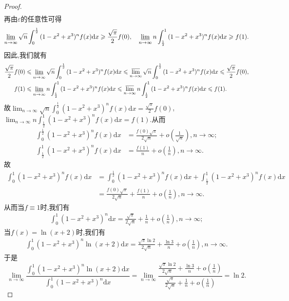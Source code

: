 \documentclass[../../main.tex]{subfiles}%
\begin{document}
\begin{proof}
\begin{align*}
\end{align*}
再由\(\varepsilon\)的任意性可得
\begin{align*}
\varliminf_{n\rightarrow\infty}\sqrt{n}\int_0^{\frac{1}{2}}{(1 - x^2 + x^3)^nf(x)\mathrm{d}x}\geqslant \frac{\sqrt{\pi}}{2}f(0),\quad \varliminf_{n\rightarrow\infty}n\int_{\frac{1}{2}}^1{(1 - x^2 + x^3)^nf(x)\mathrm{d}x}\geqslant f(1).
\end{align*}
因此,我们就有
\begin{align*}
\frac{\sqrt{\pi}}{2}f(0)&\leqslant \varliminf_{n\rightarrow\infty}\sqrt{n}\int_0^{\frac{1}{2}}{(1 - x^2 + x^3)^nf(x)\mathrm{d}x}\leqslant \varlimsup_{n\rightarrow\infty}\sqrt{n}\int_0^{\frac{1}{2}}{(1 - x^2 + x^3)^nf(x)\mathrm{d}x}\leqslant \frac{\sqrt{\pi}}{2}f(0),\\
f(1)&\leqslant \varliminf_{n\rightarrow\infty}n\int_{\frac{1}{2}}^1{(1 - x^2 + x^3)^nf(x)\mathrm{d}x}\leqslant \varlimsup_{n\rightarrow\infty}n\int_{\frac{1}{2}}^1{(1 - x^2 + x^3)^nf(x)\mathrm{d}x}\leqslant f(1).
\end{align*}
故\(\lim_{n\rightarrow\infty}\sqrt{n}\int_0^{\frac{1}{2}}{(1 - x^2 + x^3)^nf(x)\mathrm{d}x}=\frac{\sqrt{\pi}}{2}f(0)\),\(\lim_{n\rightarrow\infty}n\int_{\frac{1}{2}}^1{(1 - x^2 + x^3)^nf(x)\mathrm{d}x}=f(1)\).从而
\begin{align*}
\int_0^{\frac{1}{2}}{(1 - x^2 + x^3)^nf(x)\mathrm{d}x}&=\frac{f(0)\sqrt{\pi}}{2\sqrt{n}}+o\left(\frac{1}{\sqrt{n}}\right),  n\rightarrow\infty;\\
\int_{\frac{1}{2}}^1{(1 - x^2 + x^3)^nf(x)\mathrm{d}x}&=\frac{f(1)}{n}+o\left(\frac{1}{n}\right),  n\rightarrow\infty.
\end{align*}
故
\begin{align*}
\int_0^1{(1 - x^2 + x^3)^nf(x)\mathrm{d}x}&=\int_0^{\frac{1}{2}}{(1 - x^2 + x^3)^nf(x)\mathrm{d}x}+\int_{\frac{1}{2}}^1{(1 - x^2 + x^3)^nf(x)\mathrm{d}x}
\\
&=\frac{f(0)\sqrt{\pi}}{2\sqrt{n}}+\frac{f(1)}{n}+o\left(\frac{1}{n}\right),  n\rightarrow\infty.
\end{align*}
从而当\(f\equiv 1\)时,我们有
\begin{align*}
\int_0^1{(1 - x^2 + x^3)^n\mathrm{d}x}=\frac{\sqrt{\pi}}{2\sqrt{n}}+\frac{1}{n}+o\left(\frac{1}{n}\right),  n\rightarrow\infty;
\end{align*}
当\(f(x) = \ln(x + 2)\)时,我们有
\begin{align*}\int_0^1{(1 - x^2 + x^3)^n\ln(x + 2)\mathrm{d}x}=\frac{\sqrt{\pi}\ln 2}{2\sqrt{n}}+\frac{\ln 3}{n}+o\left(\frac{1}{n}\right),  n\rightarrow\infty.
\end{align*}
于是
\[
\lim_{n\rightarrow\infty}\frac{\int_0^1{(1 - x^2 + x^3)^n\ln(x + 2)\mathrm{d}x}}{\int_0^1{(1 - x^2 + x^3)^n\mathrm{d}x}}=\lim_{n\rightarrow\infty}\frac{\frac{\sqrt{\pi}\ln 2}{2\sqrt{n}}+\frac{\ln 3}{n}+o\left(\frac{1}{n}\right)}{\frac{\sqrt{\pi}}{2\sqrt{n}}+\frac{1}{n}+o\left(\frac{1}{n}\right)}=\ln 2.
\]

\end{proof}
\end{document}
